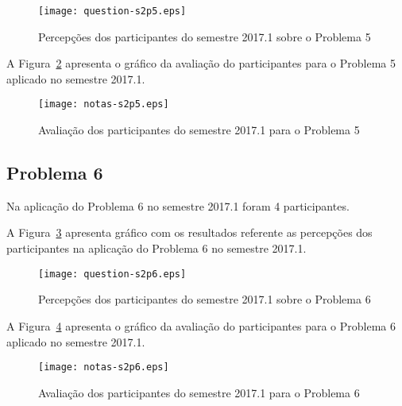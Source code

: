 \begin{figure}[!htb]
\centering
\texttt{[image: question-s2p5.eps]}
\caption{Percepções dos participantes do semestre 2017.1 sobre o Problema 5}
\label{percep-s2p5}
\end{figure}

A Figura~\ref{aval-s2p5} apresenta o gráfico da
avaliação do participantes para o Problema 5 aplicado no semestre 2017.1.

\begin{figure}[!htb]
\centering
\texttt{[image: notas-s2p5.eps]}
\caption{Avaliação dos participantes do semestre 2017.1 para o Problema 5}
\label{aval-s2p5}
\end{figure}

\subsection{Problema 6}
Na aplicação do Problema 6 no semestre 2017.1 foram 4 participantes.

A Figura~\ref{percep-s2p6} apresenta gráfico com os resultados referente
as percepções dos participantes na aplicação do
Problema 6 no semestre 2017.1.

\begin{figure}[!htb]
\centering
\texttt{[image: question-s2p6.eps]}
\caption{Percepções dos participantes do semestre 2017.1 sobre o Problema 6}
\label{percep-s2p6}
\end{figure}

A Figura~\ref{aval-s2p6} apresenta o gráfico da
avaliação do participantes para o Problema 6 aplicado no semestre 2017.1.

\begin{figure}[!htb]
\centering
\texttt{[image: notas-s2p6.eps]}
\caption{Avaliação dos participantes do semestre 2017.1 para o Problema 6}
\label{aval-s2p6}
\end{figure}
